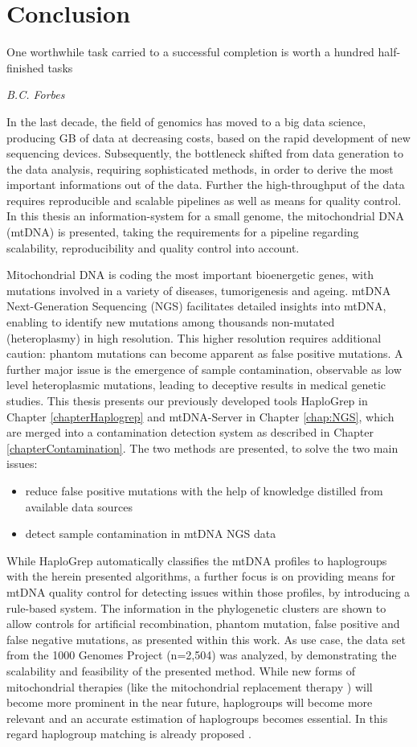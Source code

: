 \chapter{Conclusion}
\label{chap:conclusion}

\epigraph{One worthwhile task carried to a successful completion is worth a hundred half-finished tasks}{\textit{B.C. Forbes}}

In the last decade, the  field of genomics has moved to a big data science, producing GB of data at decreasing costs, based on the rapid development of new sequencing devices. Subsequently, the bottleneck shifted from data generation to the data analysis, requiring sophisticated methods, in order to derive the most important informations out of the data. Further the high-throughput of the data requires reproducible and scalable pipelines as well as means for quality control. In this thesis an information-system for a small genome, the mitochondrial DNA (mtDNA) is presented, taking the requirements for a pipeline regarding scalability, reproducibility and quality control into account. 

Mitochondrial DNA is coding the most important bioenergetic genes, with mutations involved in a variety of diseases, tumorigenesis and ageing. mtDNA Next-Generation Sequencing (NGS) facilitates detailed insights into mtDNA, enabling to identify new mutations among thousands non-mutated (heteroplasmy) in high resolution. This higher resolution requires additional caution: phantom mutations can become apparent as false positive mutations. A further major issue is the emergence of sample contamination, observable as low level heteroplasmic mutations, leading to deceptive results in medical genetic studies.
This thesis presents our previously developed tools HaploGrep in Chapter \ref{chapterHaplogrep} and mtDNA-Server in Chapter \ref{chap:NGS}, which are merged into a contamination detection system as described in Chapter \ref{chapterContamination}. The two methods are presented, to solve the two main issues:
\begin{itemize}
\item reduce false positive mutations with the help of knowledge distilled from available data sources  
\item detect sample contamination in mtDNA NGS data
\end{itemize}
While HaploGrep automatically classifies the mtDNA profiles to haplogroups with the herein presented algorithms, a further focus is on providing means for mtDNA quality control for detecting issues within those profiles, by introducing a rule-based system. The information in the phylogenetic clusters are shown to allow controls for artificial recombination, phantom mutation, false positive and false negative mutations, as presented within this work. As use case, the data set from the 1000 Genomes Project (n=2,504) was analyzed, by demonstrating the scalability and feasibility of the presented method. While new forms of mitochondrial therapies (like the mitochondrial replacement therapy \cite{Falk2016}) will become more prominent in the near future, haplogroups will become more relevant and an accurate estimation of haplogroups becomes essential. In this regard haplogroup matching is already proposed \cite{Royrvik2016}.

